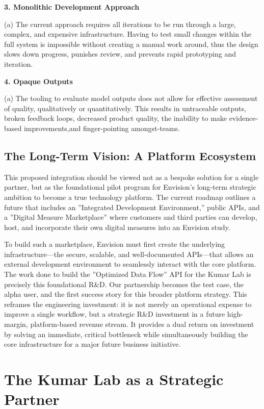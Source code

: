 \documentclass[11pt,a4paper]{article}
\begin{document}
\textbf{3. Monolithic Development Approach}

(a) The current approach requires all iterations to be run through a large, complex,
and expensive infrastructure. Having to test small changes within the full system
is impossible without creating a manual work around, thus the design slows down
progress, punishes review, and prevents rapid prototyping and iteration.

\textbf{4. Opaque Outputs}

(a) The tooling to evaluate model outputs does not allow for effective assessment of
quality, qualitatively or quantitatively. This results in untraceable outputs, broken
feedback loops, decreased product quality, the inability to make evidence-based improvements,and finger-pointing amongst-teams.

\subsection{The Long-Term Vision: A Platform Ecosystem}

This proposed integration should be viewed not as a bespoke solution for a single partner, but as the foundational pilot program for Envision’s long-term strategic ambition to become a true technology platform. The current roadmap outlines a future that includes an ”Integrated Development Environment,” public APIs, and a ”Digital Measure Marketplace” where customers and third parties can develop, host, and incorporate their own digital measures into an Envision study.

To build such a marketplace, Envision must first create the underlying infrastructure—the secure, scalable, and well-documented APIs—that allows an external development environment to seamlessly interact with the core platform. The work done to build the ”Optimized Data Flow” API for the Kumar Lab is precisely this foundational R\&D. Our partnership becomes the test case, the alpha user, and the first success story for this broader platform strategy. This reframes the engineering investment: it is not merely an operational expense to improve a single workflow, but a strategic R\&D investment in a future high-margin, platform-based revenue stream. It provides a dual return on investment by solving an immediate, critical bottleneck while simultaneously building the core infrastructure for a major future business initiative.

\section{The Kumar Lab as a Strategic Partner}
\end{document}
